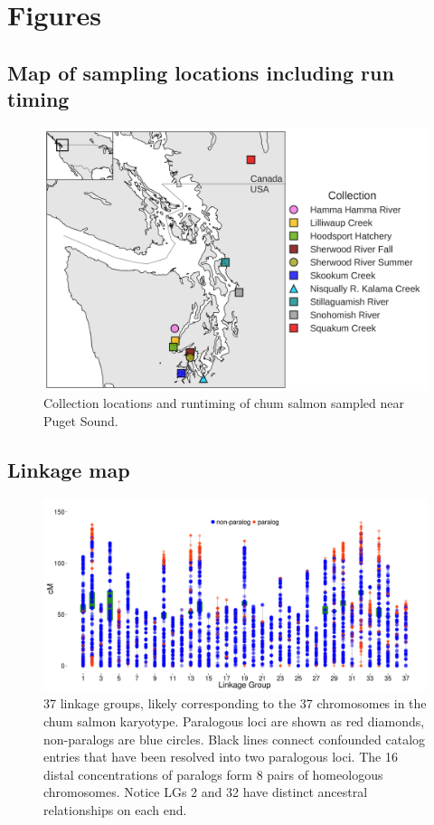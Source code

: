 \documentclass[12pt, one column]{article}
\begin{document}
% 

\listoffigures 

\listoftables

\pagebreak
\section*{Figures}
\subsection*{Map of sampling locations including run timing}
\begin{figure}[H]
\includegraphics[scale=.6]{figures/collection_map_colors.png}
\caption[Collection locations]{Collection locations and runtiming of chum salmon sampled near Puget Sound.}
\end{figure}

\subsection*{Linkage map}
\begin{figure}[H]
\includegraphics[scale=.26]{figures/linkage_map.png}
\caption[Linkage map of chum salmon]{37 linkage groups, likely corresponding to the 37 chromosomes in the chum salmon karyotype. Paralogous loci are shown as red diamonds, non-paralogs are blue circles. Black lines connect confounded catalog entries that have been resolved into two paralogous loci. The 16 distal concentrations of paralogs form 8 pairs of homeologous chromosomes. Notice LGs 2 and 32 have distinct ancestral relationships on each end.}
\end{figure}
\end{document}
